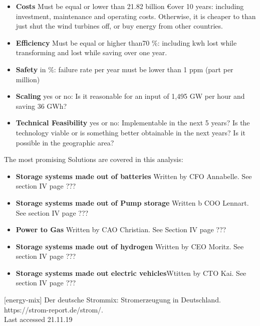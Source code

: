 \documentclass[12pt,a4paper]{article}
\begin{document}
\begin{parcolumns}[colwidths={1=2.5 cm, 2=10 cm, 3=2.5cm}]{3}
{\begin{itemize}
\item \textbf{Costs} Must be equal or lower than 21.82 billion \euro over 10 years: including investment, maintenance and operating costs. Otherwise, it is cheaper to than just shut the wind turbines off, or buy energy from other countries.
\item \textbf{Efficiency} Must be equal or higher than70 $\%$: including kwh lost while transforming and lost while saving over one year.
\item \textbf{Safety} in $\%$: failure rate per year must be lower than 1 ppm (part per million)
\item \textbf{Scaling} yes or no: Is it reasonable for an input of 1,495 GW per hour and saving 36 GWh? 
\item \textbf{Technical Feasibility} yes or no: Implementable in the next 5 years? Is the technology viable or is something better obtainable in the next years? Is it possible in the geographic area?  
\\
\end{itemize}
The most promising Solutions are covered in this analysis:
\begin{itemize}
\item \textbf{Storage systems made out of batteries} \newline Written by CFO Annabelle. See section IV page ???
\item \textbf{Storage systems made out of Pump storage} \newline Written b COO Lennart. See section IV page ???
\item \textbf{Power to Gas} \newline Written by CAO Christian. See Section IV page ???
\item \textbf{Storage systems made out of hydrogen} \newline Written by CEO Moritz. See section IV page ???
\item \textbf{Storage systems made out electric vehicles}\newline Wtitten by CTO Kai. See section IV page ???
\\
\end{itemize}
[energy-mix]  Der deutsche Strommix: Stromerzeugung in Deutschland. \\https://strom-report.de/strom/.\\Last accessed 21.11.19


}


\end{parcolumns}
\end{document}
